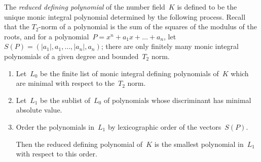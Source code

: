 \documentclass{article}
\def\Z{{\mathbb Z}}
\begin{document}
The \emph{reduced defining polynomial} of the number field~$K$ is
defined to be the unique monic integral polynomial determined by the
following process. Recall that the $T_2$-norm of a polynomial is the
sum of the squares of the modulus of the roots, and for a
polynomial~$P = x^n + a_1x + \dots + a_n$, let~$S(P) =
(|a_1|,a_1,\dots,|a_n|,a_n)$; there are only finitely many monic integral
polynomials of a given degree and bounded~$T_2$ norm.
\begin{enumerate}
  \item Let~$L_0$ be the finite list of monic integral defining polynomials
    of~$K$ which are minimal with respect to the~$T_2$ norm.
  \item Let~$L_1$ be the sublist of~$L_0$ of polynomials whose
    discriminant has minimal absolute value.
  \item Order the polynomials in~$L_1$ by lexicographic order of the
    vectors~$S(P)$.

    Then the reduced defining polynomial of~$K$ is the smallest
    polynomial in~$L_1$ with respect to this order.
\end{enumerate}

\begin{comment} %
\begin{enumerate}
  \item Let~$L_0$ be the list of characteristic polynomials in $\Z[x]$
    of integral primitive elements of~$K$, minimal with respect to
    the~$T_2$ norm (the sum of the squares of the modulus of the
    roots).
  \item Let~$L_1$ be the sublist of~$L_0$ of polynomials whose discriminant has
    minimal absolute value.
  \item Let~$L_2$ be the sublist of~$L_1$ defined as follows. In each
    pair~$\{P(x), (-1)^{\deg P}P(-x)\}$ of monic polynomials, choose the unique
    polynomial~$Q$ such that when written~$Q(x) = Q_1(x^2)+xQ_2(x^2)$, at most
    one of~$Q_1,Q_2$ has positive leading coefficient.
  \item Order the integers by absolute value first, breaking ties by
    putting~$-|x|$ before~$|x|$. Order the polynomials in~$L_2$ by the
    lexicographic order of the coefficient vectors (from the leading coefficient
    to the constant coefficient) where integers are ordered as above. Then the
    {\tt polredabs} polynomial of~$K$ is the smallest polynomial in~$L_2$ for
    that order.
\end{enumerate}
\end{comment}
\end{document}
